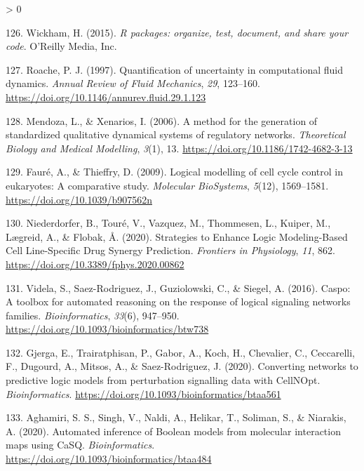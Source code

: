 \documentclass[
  12pt,
]{book}
\newlength{\cslhangindent}
\newenvironment{CSLReferences}[2] %
 {%
  \setlength{\parindent}{0pt}
  \ifodd #1 \everypar{\setlength{\hangindent}{\cslhangindent}}\ignorespaces\fi
  \ifnum #2 > 0
  \setlength{\parskip}{#2\baselineskip}
  \fi
 }%
 {}
\begin{document}
\begin{CSLReferences}{1}{0}
\leavevmode\hypertarget{ref-Wickham2015}{}%
126. Wickham, H. (2015). \emph{{R packages: organize, test, document, and share your code}}. O'Reilly Media, Inc.

\leavevmode\hypertarget{ref-Roache1997}{}%
127. Roache, P. J. (1997). {Quantification of uncertainty in computational fluid dynamics}. \emph{Annual Review of Fluid Mechanics}, \emph{29}, 123--160. \url{https://doi.org/10.1146/annurev.fluid.29.1.123}

\leavevmode\hypertarget{ref-Mendoza2006}{}%
128. Mendoza, L., \& Xenarios, I. (2006). {A method for the generation of standardized qualitative dynamical systems of regulatory networks}. \emph{Theoretical Biology and Medical Modelling}, \emph{3}(1), 13. \url{https://doi.org/10.1186/1742-4682-3-13}

\leavevmode\hypertarget{ref-Faure2009}{}%
129. Fauré, A., \& Thieffry, D. (2009). {Logical modelling of cell cycle control in eukaryotes: A comparative study}. \emph{Molecular BioSystems}, \emph{5}(12), 1569--1581. \url{https://doi.org/10.1039/b907562n}

\leavevmode\hypertarget{ref-Niederdorfer2020}{}%
130. Niederdorfer, B., Touré, V., Vazquez, M., Thommesen, L., Kuiper, M., Lægreid, A., \& Flobak, Å. (2020). {Strategies to Enhance Logic Modeling-Based Cell Line-Specific Drug Synergy Prediction}. \emph{Frontiers in Physiology}, \emph{11}, 862. \url{https://doi.org/10.3389/fphys.2020.00862}

\leavevmode\hypertarget{ref-Videla2016}{}%
131. Videla, S., Saez-Rodriguez, J., Guziolowski, C., \& Siegel, A. (2016). Caspo: A toolbox for automated reasoning on the response of logical signaling networks families. \emph{Bioinformatics}, \emph{33}(6), 947--950. \url{https://doi.org/10.1093/bioinformatics/btw738}

\leavevmode\hypertarget{ref-Gjerga2020}{}%
132. Gjerga, E., Trairatphisan, P., Gabor, A., Koch, H., Chevalier, C., Ceccarelli, F., Dugourd, A., Mitsos, A., \& Saez-Rodriguez, J. (2020). {Converting networks to predictive logic models from perturbation signalling data with CellNOpt}. \emph{Bioinformatics}. \url{https://doi.org/10.1093/bioinformatics/btaa561}

\leavevmode\hypertarget{ref-Aghamiri2020}{}%
133. Aghamiri, S. S., Singh, V., Naldi, A., Helikar, T., Soliman, S., \& Niarakis, A. (2020). {Automated inference of Boolean models from molecular interaction maps using CaSQ}. \emph{Bioinformatics}. \url{https://doi.org/10.1093/bioinformatics/btaa484}


\end{CSLReferences}
\end{document}
